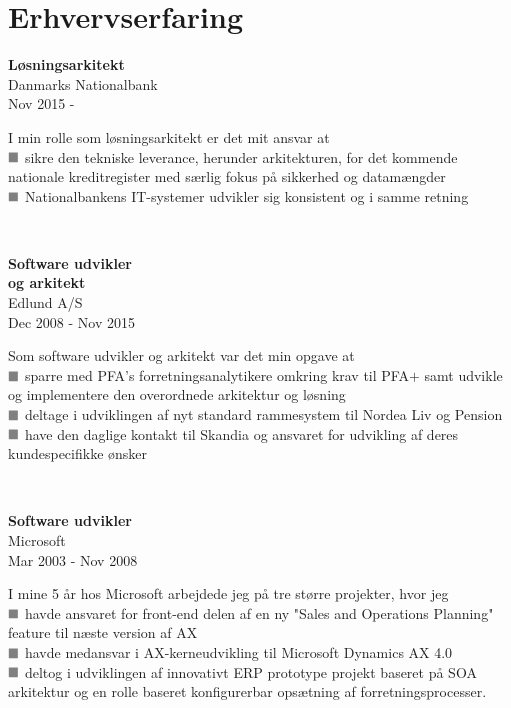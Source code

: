 \documentclass[10pt, a4paper]{article}
\newcommand*{\greysquare}{\textcolor{gray}{\blacksquare}}
\begin{document}
\section{Erhvervserfaring}
\begin{Row}%
  \begin{Cell}{1}
    \textbf{Løsningsarkitekt} \\ [1ex]
    Danmarks Nationalbank \\ 
    Nov 2015 -   
  \end{Cell}
  \begin{Cell}{3}
    I min rolle som løsningsarkitekt er det mit ansvar at \\ [1ex]
    $\greysquare$ sikre den tekniske leverance, herunder arkitekturen, for det kommende nationale kreditregister med særlig fokus på sikkerhed og datamængder \\
    $\greysquare$ Nationalbankens IT-systemer udvikler sig konsistent og i samme retning
  \end{Cell}
\end{Row}
\\[0.5cm]
\begin{Row}
  \begin{Cell}{1}
    \textbf{Software udvikler \\ 
    og arkitekt} \\ [1ex]
    Edlund A/S \\ 
    Dec 2008 - Nov 2015  
  \end{Cell}
  \begin{Cell}{3}
    Som software udvikler og arkitekt var det min opgave at \\ [1ex]
    $\greysquare$ sparre med PFA's forretningsanalytikere omkring krav til PFA$+$ samt udvikle og implementere den overordnede arkitektur og løsning \\
    $\greysquare$ deltage i udviklingen af nyt standard rammesystem til Nordea Liv og Pension \\
    $\greysquare$ have den daglige kontakt til Skandia og ansvaret for udvikling af deres kundespecifikke ønsker
  \end{Cell}
\end{Row}
\\[0.5cm]
\begin{Row}%
  \begin{Cell}{1}
    \textbf{Software udvikler} \\ [1ex]
    Microsoft \\ 
    Mar 2003 - Nov 2008  
  \end{Cell}
  \begin{Cell}{3}
    I mine 5 år hos Microsoft arbejdede jeg på tre større projekter, hvor jeg \\ [1ex]
    $\greysquare$ havde ansvaret for front-end delen af en ny "Sales and Operations Planning" feature til næste version af AX \\
    $\greysquare$ havde medansvar i AX-kerneudvikling til Microsoft Dynamics AX 4.0 \\
    $\greysquare$ deltog i udviklingen af innovativt ERP prototype projekt baseret på SOA arkitektur og en rolle baseret konfigurerbar opsætning af forretningsprocesser. 
  \end{Cell}
\end{Row}
\end{document}
